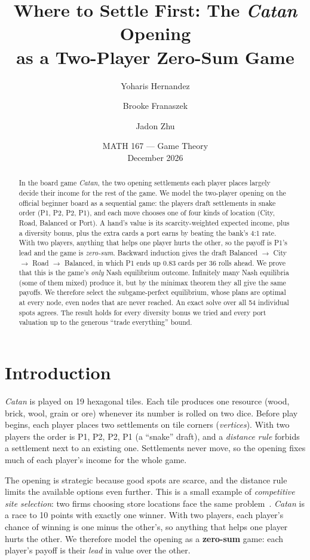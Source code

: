 \documentclass[11pt]{article}
\title{Where to Settle First: The \emph{Catan} Opening\\as a Two-Player Zero-Sum Game}
\author{Yoharis Hernandez \and Brooke Franaszek \and Jadon Zhu}
\date{MATH 167 --- Game Theory\\[4pt] December 2026}
\begin{document}
\maketitle

\begin{abstract}
In the board game \emph{Catan}, the two opening settlements each player places largely decide their income for the rest of the game. We model the two-player opening on the official beginner board as a sequential game: the players draft settlements in snake order (P1, P2, P2, P1), and each move chooses one of four kinds of location (City, Road, Balanced or Port). A hand's value is its scarcity-weighted expected income, plus a diversity bonus, plus the extra cards a port earns by beating the bank's 4:1 rate. With two players, anything that helps one player hurts the other, so the payoff is P1's lead and the game is \emph{zero-sum}. Backward induction gives the draft Balanced $\to$ City $\to$ Road $\to$ Balanced, in which P1 ends up $0.83$ cards per 36 rolls ahead. We prove that this is the game's \emph{only} Nash equilibrium outcome. Infinitely many Nash equilibria (some of them mixed) produce it, but by the minimax theorem they all give the same payoffs. We therefore select the subgame-perfect equilibrium, whose plans are optimal at every node, even nodes that are never reached. An exact solve over all 54 individual spots agrees. The result holds for every diversity bonus we tried and every port valuation up to the generous ``trade everything'' bound.
\end{abstract}

\section{Introduction}
\emph{Catan} is played on 19 hexagonal tiles. Each tile produces one resource (wood, brick, wool, grain or ore) whenever its number is rolled on two dice. Before play begins, each player places two settlements on tile corners (\emph{vertices}). With two players the order is P1, P2, P2, P1 (a ``snake'' draft), and a \emph{distance rule} forbids a settlement next to an existing one. Settlements never move, so the opening fixes much of each player's income for the whole game.

The opening is strategic because good spots are scarce, and the distance rule limits the available options even further. This is a small example of \emph{competitive site selection}: two firms choosing store locations face the same problem~\cite{hotelling}. \emph{Catan} is a race to 10 points with exactly one winner. With two players, each player's chance of winning is one minus the other's, so anything that helps one player hurts the other. We therefore model the opening as a \textbf{zero-sum} game: each player's payoff is their \emph{lead} in value over the other.
\end{document}
